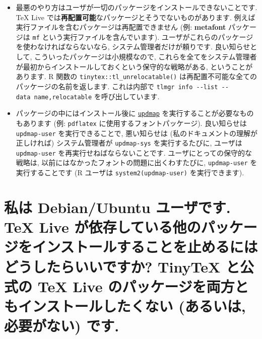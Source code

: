 \documentclass[
  xelatex,ja=standard,jafont=noto]{bxjsreport}
\begin{document}
\begin{itemize}
\item
  最悪のやり方はユーザが一切のパッケージをインストールできないことです.
  TeX Live
  では\textbf{再配置可能}なパッケージとそうでないものがあります.
  例えば実行ファイルを含むパッケージは再配置できません (例:
  \textbf{metafont} パッケージは \texttt{mf}
  という実行ファイルを含んでいます).
  ユーザがこれらのパッケージを使わなければならないなら,
  システム管理者だけが頼りです. 良い知らせとして,
  こういったパッケージは小規模なので,
  これらを全てをシステム管理者が最初からインストールしておくという保守的な戦略がある,
  ということがあります. R 関数の \texttt{tinytex::tl\_unrelocatable()}
  は再配置不可能な全てのパッケージの名前を返します. これは内部で
  \texttt{tlmgr\ info\ -\/-list\ -\/-data\ name,relocatable}
  を呼び出しています.
\item
  パッケージの中にはインストール後に
  \href{https://www.tug.org/texlive/doc/updmap.html}{\texttt{updmap}}
  を実行することが必要なものもあります (例: \texttt{pdflatex}
  に使用するフォントパッケージ). 良い知らせは \texttt{updmap-user}
  を実行できることで, 悪い知らせは (私のドキュメントの理解が正しければ)
  システム管理者が \texttt{updmap-sys} を実行するたびに, ユーザは
  \texttt{updmap-user} を再実行せねばならないことです.
  ユーザにとっての保守的な戦略は,
  以前にはなかったフォントの問題に出くわすたびに, \texttt{updmap-user}
  を実行することです (R ユーザは
  \texttt{system2(\textquotesingle{}updmap-user\textquotesingle{})}
  を実行できます).
\end{itemize}

\hypertarget{ux79c1ux306f-debianubuntu-ux30e6ux30fcux30b6ux3067ux3059.-tex-live-ux304cux4f9dux5b58ux3057ux3066ux3044ux308bux4ed6ux306eux30d1ux30c3ux30b1ux30fcux30b8ux3092ux30a4ux30f3ux30b9ux30c8ux30fcux30ebux3059ux308bux3053ux3068ux3092ux6b62ux3081ux308bux306bux306fux3069ux3046ux3057ux305fux3089ux3044ux3044ux3067ux3059ux304b-tinytex-ux3068ux516cux5f0fux306e-tex-live-ux306eux30d1ux30c3ux30b1ux30fcux30b8ux3092ux4e21ux65b9ux3068ux3082ux30a4ux30f3ux30b9ux30c8ux30fcux30ebux3057ux305fux304fux306aux3044-ux3042ux308bux3044ux306f-ux5fc5ux8981ux304cux306aux3044-ux3067ux3059.}{%
\section{私は Debian/Ubuntu ユーザです. TeX Live
が依存している他のパッケージをインストールすることを止めるにはどうしたらいいですか?
TinyTeX と公式の TeX Live のパッケージを両方ともインストールしたくない
(あるいは, 必要がない)
です.}\label{ux79c1ux306f-debianubuntu-ux30e6ux30fcux30b6ux3067ux3059.-tex-live-ux304cux4f9dux5b58ux3057ux3066ux3044ux308bux4ed6ux306eux30d1ux30c3ux30b1ux30fcux30b8ux3092ux30a4ux30f3ux30b9ux30c8ux30fcux30ebux3059ux308bux3053ux3068ux3092ux6b62ux3081ux308bux306bux306fux3069ux3046ux3057ux305fux3089ux3044ux3044ux3067ux3059ux304b-tinytex-ux3068ux516cux5f0fux306e-tex-live-ux306eux30d1ux30c3ux30b1ux30fcux30b8ux3092ux4e21ux65b9ux3068ux3082ux30a4ux30f3ux30b9ux30c8ux30fcux30ebux3057ux305fux304fux306aux3044-ux3042ux308bux3044ux306f-ux5fc5ux8981ux304cux306aux3044-ux3067ux3059.}}
\end{document}
